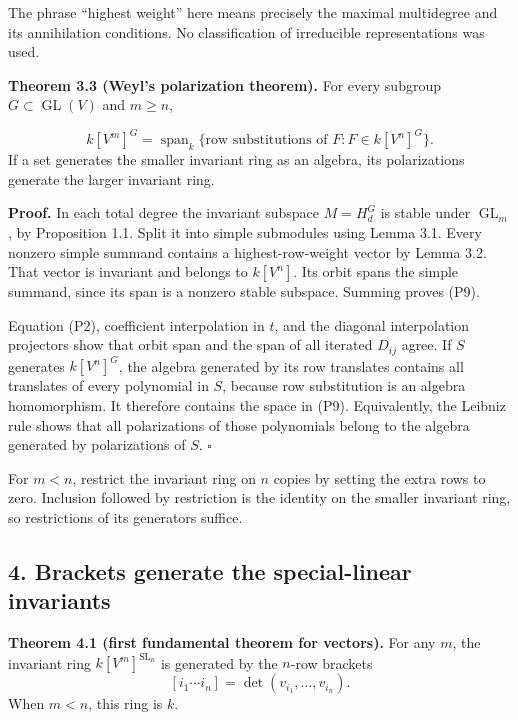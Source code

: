 \documentclass[
]{article}
\begin{document}
The phrase ``highest weight'' here means precisely the maximal
multidegree and its annihilation conditions. No classification of
irreducible representations was used.

\protect{}\label{theorem-3-3}{}

\textbf{Theorem 3.3 (Weyl's polarization theorem).} For every subgroup
\(G\subset\operatorname{GL}(V)\) and \(m\geq n\),
\protect{}\label{equation-P9}{}

\[
k [V^m]^G
=\operatorname{span}_k\{\text{row substitutions of }F:
F\in k [V^n]^G\}.
\tag{P9}
\] If a set generates the smaller invariant ring as an algebra, its
polarizations generate the larger invariant ring.

\textbf{Proof.} In each total degree the invariant subspace \(M=H_d^G\)
is stable under \(\operatorname{GL}_m\), by Proposition 1.1. Split it
into simple submodules using Lemma 3.1. Every nonzero simple summand
contains a highest-row-weight vector by Lemma 3.2. That vector is
invariant and belongs to \(k [V^n]\). Its orbit spans the simple
summand, since its span is a nonzero stable subspace. Summing proves
(P9).

Equation (P2), coefficient interpolation in \(t\), and the diagonal
interpolation projectors show that orbit span and the span of all
iterated \(D_{ij}\) agree. If \(S\) generates \(k [V^n]^G\), the algebra
generated by its row translates contains all translates of every
polynomial in \(S\), because row substitution is an algebra
homomorphism. It therefore contains the space in (P9). Equivalently, the
Leibniz rule shows that all polarizations of those polynomials belong to
the algebra generated by polarizations of \(S\). \(\square\)

For \(m<n\), restrict the invariant ring on \(n\) copies by setting the
extra rows to zero. Inclusion followed by restriction is the identity on
the smaller invariant ring, so restrictions of its generators suffice.

\subsection{4. Brackets generate the special-linear
invariants}\label{section-4}

\protect{}\label{theorem-4-1}{}

\textbf{Theorem 4.1 (first fundamental theorem for vectors).} For any
\(m\), the invariant ring \(k [V^m]^{\operatorname{SL}_n}\) is generated
by the \(n\)-row brackets \[
[i_1\cdots i_n]=\det(v_{i_1},\ldots,v_{i_n}).
\] When \(m<n\), this ring is \(k\).
\end{document}
